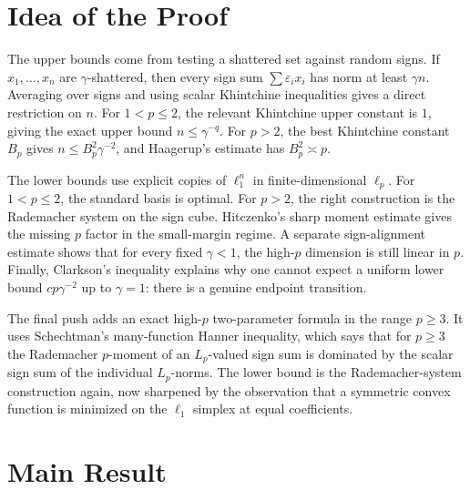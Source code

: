 \documentclass[11pt]{article}
\newcommand{\eps}{\varepsilon}
\begin{document}
\section*{Idea of the Proof}

The upper bounds come from testing a shattered set against random signs.  If
\(x_1,\ldots,x_n\) are \(\gamma\)-shattered, then every sign sum
\(\sum \eps_i x_i\) has norm at least \(\gamma n\).  Averaging over signs and
using scalar Khintchine inequalities gives a direct restriction on \(n\).
For \(1<p\le2\), the relevant Khintchine upper constant is \(1\), giving the
exact upper bound \(n\le\gamma^{-q}\).  For \(p>2\), the best Khintchine
constant \(B_p\) gives \(n\le B_p^2\gamma^{-2}\), and Haagerup's estimate has
\(B_p^2\asymp p\).

The lower bounds use explicit copies of \(\ell_1^n\) in finite-dimensional
\(\ell_p\).  For \(1<p\le2\), the standard basis is optimal.  For \(p>2\), the
right construction is the Rademacher system on the sign cube.  Hitczenko's
sharp moment estimate gives the missing \(p\) factor in the small-margin
regime.  A separate sign-alignment estimate shows that for every fixed
\(\gamma<1\), the high-\(p\) dimension is still linear in \(p\).  Finally,
Clarkson's inequality explains why one cannot expect a uniform lower bound
\(c p\gamma^{-2}\) up to \(\gamma=1\): there is a genuine endpoint transition.

The final push adds an exact high-\(p\) two-parameter formula in the range
\(p\ge3\).  It uses Schechtman's many-function Hanner inequality, which says
that for \(p\ge3\) the Rademacher \(p\)-moment of an \(L_p\)-valued sign sum is
dominated by the scalar sign sum of the individual \(L_p\)-norms.  The lower
bound is the Rademacher-system construction again, now sharpened by the
observation that a symmetric convex function is minimized on the \(\ell_1\)
simplex at equal coefficients.

\section*{Main Result}
\end{document}
